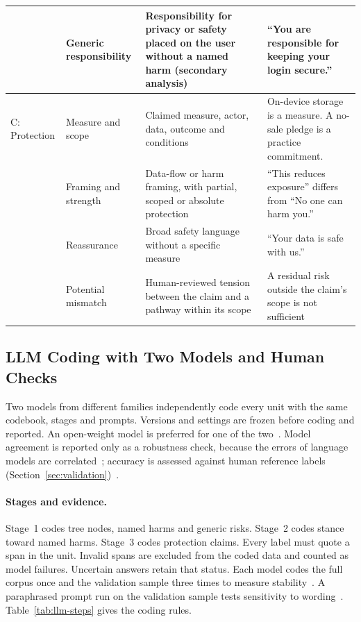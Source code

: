 \begin{table}[!t]
\begin{singlespace}
\begin{tabularx}{\textwidth}{@{}L{1.6cm}L{2.8cm}>{\raggedright\arraybackslash}X>{\raggedright\arraybackslash}X@{}}
\rowrule
 & Generic responsibility & Responsibility for privacy or safety placed on the user without a named harm (secondary analysis)
  & \enquote{You are responsible for keeping your login secure.} \\
\midrule
C: Protection & Measure and scope & Claimed measure, actor, data, outcome and conditions
  & On-device storage is a measure. A no-sale pledge is a practice commitment. \\
\rowrule
 & Framing and strength & Data-flow or harm framing, with partial, scoped or absolute protection
  & \enquote{This reduces exposure} differs from \enquote{No one can harm you.} \\
\rowrule
 & Reassurance & Broad safety language without a specific measure
  & \enquote{Your data is safe with us.} \\
\rowrule
 & Potential mismatch & Human-reviewed tension between the claim and a pathway within its scope
  & A residual risk outside the claim's scope is not sufficient \\
\bottomrule
\end{tabularx}
\end{singlespace}
\end{table}

\subsection{LLM Coding with Two Models and Human Checks}
\label{sec:llm}
Two models from different families independently code every unit with the same codebook, stages
and prompts. Versions and settings are frozen before coding and
reported. An open-weight model is preferred for one of the two~\parencite{tornberg2024best}.
Model agreement is reported only as a robustness check, because the errors of language models
are correlated~\parencite{kim2025correlated}; accuracy is assessed against human reference labels
(Section~\ref{sec:validation})~\parencite{egami2023using,pangakis2023automated}.

\paragraph{Stages and evidence.} Stage~1 codes tree nodes, named harms and generic risks.
Stage~2 codes stance toward named harms. Stage~3 codes protection claims. Every label must quote
a span in the unit. Invalid spans are excluded from the coded data and counted as model
failures. Uncertain answers retain that status. Each model codes the full corpus once and the
validation sample three times to measure
stability~\parencite[\S4.3, pp.~3888--3889]{rodriguez2024llm}. A paraphrased prompt run on the
validation sample tests sensitivity to wording~\parencite{baumann2025llm}.
Table~\ref{tab:llm-steps} gives the coding rules.

